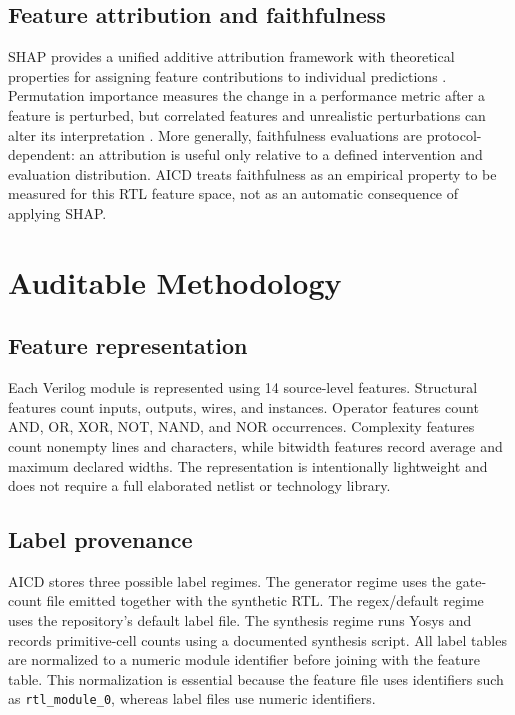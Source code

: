 \documentclass[conference]{IEEEtran}
\begin{document}
\subsection{Feature attribution and faithfulness}
SHAP provides a unified additive attribution framework with theoretical properties for assigning feature contributions to individual predictions \cite{lundberg2017shap}. Permutation importance measures the change in a performance metric after a feature is perturbed, but correlated features and unrealistic perturbations can alter its interpretation \cite{altmann2010permutation}. More generally, faithfulness evaluations are protocol-dependent: an attribution is useful only relative to a defined intervention and evaluation distribution. AICD treats faithfulness as an empirical property to be measured for this RTL feature space, not as an automatic consequence of applying SHAP.

\section{Auditable Methodology}

\subsection{Feature representation}
Each Verilog module is represented using 14 source-level features. Structural features count inputs, outputs, wires, and instances. Operator features count AND, OR, XOR, NOT, NAND, and NOR occurrences. Complexity features count nonempty lines and characters, while bitwidth features record average and maximum declared widths. The representation is intentionally lightweight and does not require a full elaborated netlist or technology library.

\subsection{Label provenance}
AICD stores three possible label regimes. The generator regime uses the gate-count file emitted together with the synthetic RTL. The regex/default regime uses the repository's default label file. The synthesis regime runs Yosys and records primitive-cell counts using a documented synthesis script. All label tables are normalized to a numeric module identifier before joining with the feature table. This normalization is essential because the feature file uses identifiers such as \texttt{rtl\_module\_0}, whereas label files use numeric identifiers.
\end{document}
